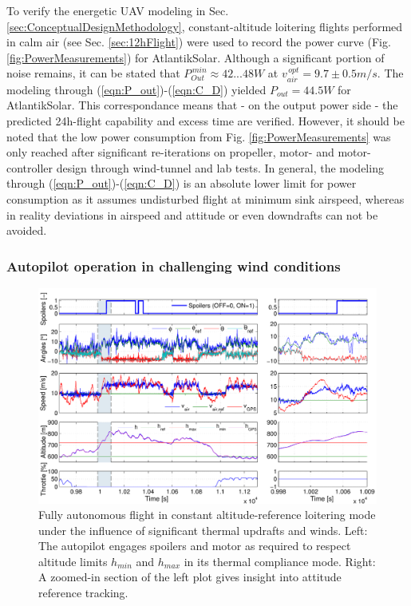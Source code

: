 To verify the energetic UAV modeling in Sec. \ref{sec:ConceptualDesignMethodology}, constant-altitude loitering flights performed in calm air (see Sec. \ref{sec:12hFlight}) were used to record the power curve (Fig. \ref{fig:PowerMeasurements}) for AtlantikSolar. Although a significant portion of noise remains, it can be stated that $P_{Out}^{\,min}\approx42...48W$ at $v_{air}^{\,opt}=9.7\pm0.5m/s$. The modeling through (\ref{eqn:P_out})-(\ref{eqn:C_D}) yielded $P_{out}=44.5W$ for AtlantikSolar. This correspondance means that - on the output power side - the predicted 24h-flight capability and excess time are verified. However, it should be noted that the low power consumption from Fig. \ref{fig:PowerMeasurements} was only reached after significant re-iterations on propeller, motor- and motor-controller design through wind-tunnel and lab tests. In general, the modeling through (\ref{eqn:P_out})-(\ref{eqn:C_D}) is an absolute lower limit for power consumption as it assumes undisturbed flight at minimum sink airspeed, whereas in reality deviations in airspeed and attitude or even downdrafts can not be avoided.

\subsubsection{Autopilot operation in challenging wind conditions}

\begin{figure}[tb]
    \centering
     \includegraphics[width=\linewidth]{images/ControlTestFlight/ControlTestFlight.pdf}
    \caption{Fully autonomous flight in constant altitude-reference loitering mode under the influence of significant thermal updrafts and winds. Left: The autopilot engages spoilers and motor as required to respect altitude limits $h_{min}$ and $h_{max}$ in its thermal compliance mode. Right: A zoomed-in section of the left plot gives insight into attitude reference tracking.} 
    \label{fig:ControlTestFlight}
\end{figure}

